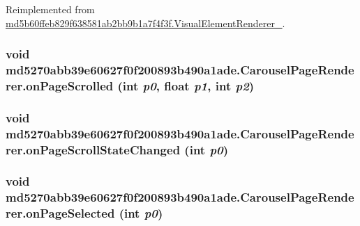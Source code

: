 Reimplemented from \hyperlink{classmd5b60ffeb829f638581ab2bb9b1a7f4f3f_1_1_visual_element_renderer__1_8c7af843aeec04827cb3a3981ea1978d}{md5b60ffeb829f638581ab2bb9b1a7f4f3f.VisualElementRenderer\_}.\hypertarget{classmd5270abb39e60627f0f200893b490a1ade_1_1_carousel_page_renderer_be81b3e31f566f0d59f1a198578b3541}{
\subsubsection[{onPageScrolled}]{\setlength{\rightskip}{0pt plus 5cm}void md5270abb39e60627f0f200893b490a1ade.CarouselPageRenderer.onPageScrolled (int {\em p0}, \/  float {\em p1}, \/  int {\em p2})}}
\label{classmd5270abb39e60627f0f200893b490a1ade_1_1_carousel_page_renderer_be81b3e31f566f0d59f1a198578b3541}


\hypertarget{classmd5270abb39e60627f0f200893b490a1ade_1_1_carousel_page_renderer_99b77538c0fbbfb488645c55e676c438}{
\subsubsection[{onPageScrollStateChanged}]{\setlength{\rightskip}{0pt plus 5cm}void md5270abb39e60627f0f200893b490a1ade.CarouselPageRenderer.onPageScrollStateChanged (int {\em p0})}}
\label{classmd5270abb39e60627f0f200893b490a1ade_1_1_carousel_page_renderer_99b77538c0fbbfb488645c55e676c438}


\hypertarget{classmd5270abb39e60627f0f200893b490a1ade_1_1_carousel_page_renderer_a3c0ad81abb02d7454b2ceed0de08148}{
\subsubsection[{onPageSelected}]{\setlength{\rightskip}{0pt plus 5cm}void md5270abb39e60627f0f200893b490a1ade.CarouselPageRenderer.onPageSelected (int {\em p0})}}
\label{classmd5270abb39e60627f0f200893b490a1ade_1_1_carousel_page_renderer_a3c0ad81abb02d7454b2ceed0de08148}




